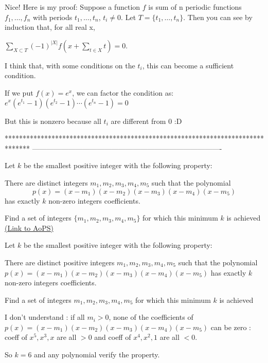 \begin{solution}
	Nice!
Here is my proof:
Suppose a function $f$ is sum of n periodic functions $f_{1},\ldots,f_{n}$ with periods $t_{1},\ldots,t_{n}$, $t_{i}\neq 0$.
Let $T = \{t_{1},\ldots,t_{n}\}$. Then you can see by induction that, for all real x, 

$\sum_{X \subset T}(-1)^{|X|}f\left( x+\sum_{t \in X}t \right) = 0$.

I think that, with some conditions on the $t_{i}$, this can become a sufficient condition.

If we put $f(x) = e^{x}$, we can factor the condition as:
$e^{x}(e^{t_{1}}-1)(e^{t_{2}}-1)\cdots (e^{t_{n}}-1) = 0$

But this is nonzero because all $t_{i}$ are different from 0  :D
\end{solution}
*******************************************************************************
-------------------------------------------------------------------------------

\begin{problem}
	Let $ k$ be the smallest positive integer with the following property:

There are distinct integers $ m_{1},m_{2},m_{3},m_{4},m_{5}$ such that the polynomial \[p(x)=(x-m_{1})(x-m_{2})(x-m_{3})(x-m_{4})(x-m_{5})\] has exactly $k$ non-zero integers coefficients.

Find a set of integers $\{m_{1},m_{2},m_{3},m_{4},m_{5}\}$ for which this minimum $k$ is achieved
	\flushright \href{https://artofproblemsolving.com/community/c6h155855}{(Link to AoPS)}
\end{problem}



\begin{solution}
	\begin{tcolorbox}Let $k$ be the smallest positive integer with the following property:

There are distinct positive integers $m_{1},m_{2},m_{3},m_{4},m_{5}$
such that the polynomial $p(x)=(x-m_{1})(x-m_{2})(x-m_{3})(x-m_{4})(x-m_{5})$ has exactly $k$ non-zero integers coefficients.

Find a set of integers $m_{1},m_{2},m_{3},m_{4},m_{5}$ for which this minimum $k$ is achieved\end{tcolorbox}

I don't understand : if all $m_{i}>0$, none of the coefficients of $p(x)=(x-m_{1})(x-m_{2})(x-m_{3})(x-m_{4})(x-m_{5})$ can be zero : coeff of $x^{5},x^{3},x$ are all $>0$ and coeff of $x^{4},x^{2},1$ are all $<0$.

So $k=6$ and any polynomial verify the property.
\end{solution}



